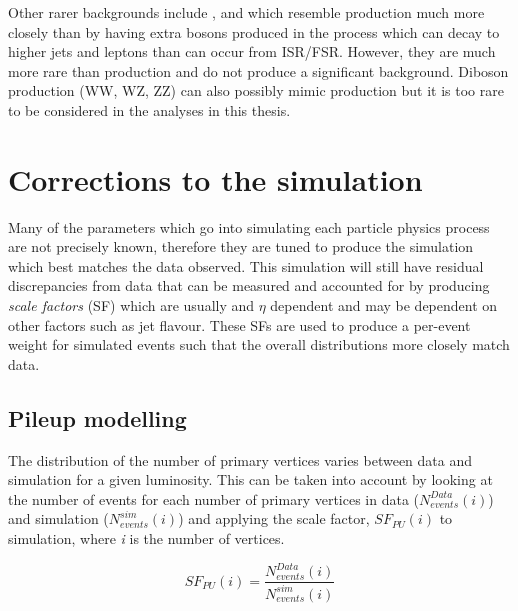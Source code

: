 
Other rarer backgrounds include \ttH, \ttZ and \ttW which resemble \tttt production much more closely than \ttbar by having extra bosons produced in the process which can decay to higher \pt jets and leptons than can occur from ISR/FSR. However, they are much more rare than \ttbar production and do not produce a significant background. Diboson production (WW, WZ, ZZ) can also possibly mimic \tttt production but it is too rare to be considered in the analyses in this thesis.


\section{Corrections to the simulation}
\label{sec:Calibrations}
Many of the parameters which go into simulating each particle physics process are not precisely known, therefore they are tuned to produce the simulation which best matches the data observed. This simulation will still have residual discrepancies from data that can be measured and accounted for by producing \emph{scale factors} (SF) which are usually \pt and $\eta$ dependent and may be dependent on other factors such as jet flavour. These SFs are used to produce a per-event weight for simulated events such that the overall distributions more closely match data. 


\subsection{Pileup modelling}
\label{sec:pile-up}
The distribution of the number of primary vertices varies between data and simulation for a given luminosity. This can be taken into account by looking at the number of events for each number of primary vertices in data (${N_{events}^{Data}(i)}$) and simulation (${N_{events}^{sim}(i)}$) and applying the scale factor, $SF_{PU}\left( i \right)$ to simulation, where \emph{i} is the number of vertices.

\begin{equation}
SF_{PU}\left( i \right) = \frac{N_{events}^{Data}(i)}{N_{events}^{sim}(i)} 
\label{eqn:PUSF}
\end{equation}

